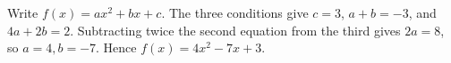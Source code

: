 Write $f(x)=ax^2+bx+c$. The three conditions give $c=3$, $a+b=-3$, and $4a+2b=2$. Subtracting twice the second equation from the third gives $2a=8$, so $a=4,b=-7$. Hence $\boxed{f(x)=4x^2-7x+3}$.
